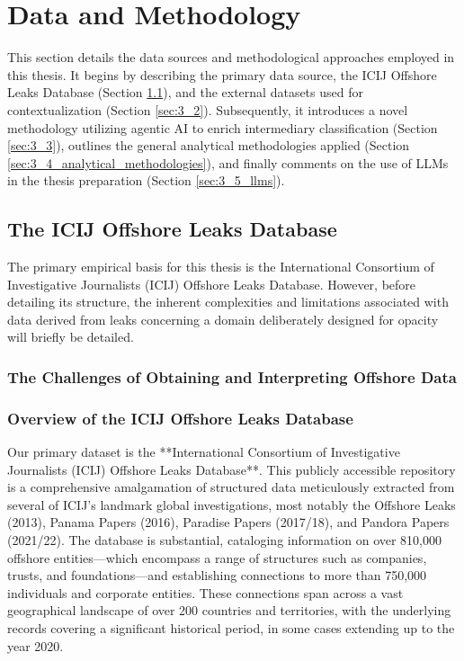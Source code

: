 \chapter{Data and Methodology}
\label{chap:data_methodology}

This section details the data sources and methodological approaches employed in this thesis. It begins by describing the primary data source, the ICIJ Offshore Leaks Database (Section \ref{sec:3_1}), and the external datasets used for contextualization (Section \ref{sec:3_2}). Subsequently, it introduces a novel methodology utilizing agentic AI to enrich intermediary classification (Section \ref{sec:3_3}), outlines the general analytical methodologies applied (Section \ref{sec:3_4_analytical_methodologies}), and finally comments on the use of LLMs in the thesis preparation (Section \ref{sec:3_5_llms}).

\section{The ICIJ Offshore Leaks Database}
\label{sec:3_1}

The primary empirical basis for this thesis is the International Consortium of Investigative Journalists (ICIJ) Offshore Leaks Database. However, before detailing its structure, the inherent complexities and limitations associated with data derived from leaks concerning a domain deliberately designed for opacity will briefly be detailed.

\subsection{The Challenges of Obtaining and Interpreting Offshore Data}
\label{sec:data_challenges}
\subsection{Overview of the ICIJ Offshore Leaks Database}

Our primary dataset is the **International Consortium of Investigative Journalists (ICIJ) Offshore Leaks Database**. This publicly accessible repository is a comprehensive amalgamation of structured data meticulously extracted from several of ICIJ's landmark global investigations, most notably the Offshore Leaks (2013), Panama Papers (2016), Paradise Papers (2017/18), and Pandora Papers (2021/22). The database is substantial, cataloging information on over 810,000 offshore entities—which encompass a range of structures such as companies, trusts, and foundations—and establishing connections to more than 750,000 individuals and corporate entities. These connections span across a vast geographical landscape of over 200 countries and territories, with the underlying records covering a significant historical period, in some cases extending up to the year 2020.

